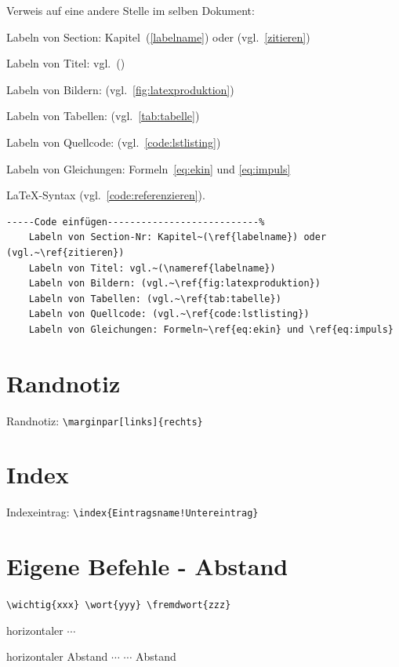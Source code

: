 Verweis auf eine andere Stelle im selben Dokument:

Labeln von Section: Kapitel~(\ref{labelname}) oder (vgl.~\ref{zitieren}) 

Labeln von Titel: vgl.~() 

Labeln von Bildern: (vgl.~\ref{fig:latexproduktion}) 

Labeln von Tabellen: (vgl.~\ref{tab:tabelle}) 

Labeln von Quellcode: (vgl.~\ref{code:lstlisting}) 

Labeln von Gleichungen: Formeln~\ref{eq:ekin} und \ref{eq:impuls}

\LaTeX -Syntax (vgl.~\ref{code:referenzieren}). 
\begin{lstlisting}[caption={Referenzieren},label={code:referenzieren},language=TeX% C, TeX, Bash, Python
]-----Code einfügen---------------------------%
	Labeln von Section-Nr: Kapitel~(\ref{labelname}) oder (vgl.~\ref{zitieren}) 
	Labeln von Titel: vgl.~(\nameref{labelname}) 
	Labeln von Bildern: (vgl.~\ref{fig:latexproduktion}) 
	Labeln von Tabellen: (vgl.~\ref{tab:tabelle}) 
	Labeln von Quellcode: (vgl.~\ref{code:lstlisting}) 
	Labeln von Gleichungen: Formeln~\ref{eq:ekin} und \ref{eq:impuls}
\end{lstlisting}

\section{Randnotiz}

Randnotiz:  
\verb|\marginpar[links]{rechts}| 

\section{Index}
	
Indexeintrag:  
\verb|\index{Eintragsname!Untereintrag}|

\section{Eigene Befehle - Abstand}

   
\verb|\wichtig{xxx} \wort{yyy} \fremdwort{zzz}|

horizontaler $\cdots$ 

horizontaler Abstand $\cdots$ \hspace{2em} $\cdots$ Abstand

